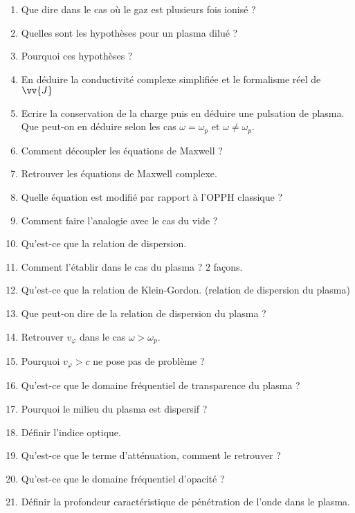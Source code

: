 \documentclass[a4paper, 11pt, hidelinks]{article}
\begin{document}
\begin{enumerate}
    \item Que dire dans le cas où le gaz est plusieurs fois ionisé ? \cite{Chapitre16}
    \item Quelles sont les hypothèses pour un plasma dilué ? \cite{Chapitre16}
    \item Pourquoi ces hypothèses ? \cite{Chapitre16}
    \item En déduire la conductivité complexe simplifiée et le formalisme réel de $\vv{J}$ \cite{Chapitre16}
    \item Ecrire la conservation de la charge puis en déduire une pulsation de plasma. Que peut-on en déduire selon les cas $\omega=\omega_p$ et $\omega\neq \omega_p$. \cite{Chapitre16}
    \item Comment découpler les équations de Maxwell ? \cite{Chapitre16}
    \item Retrouver les équations de Maxwell complexe. \cite{Chapitre16}
    \item Quelle équation est modifié par rapport à l'OPPH classique ? \cite{Chapitre16}
    \item Comment faire l'analogie avec le cas du vide ? \cite{Chapitre16}
    \item Qu'est-ce que la relation de dispersion. \cite{Chapitre16}
    \item Comment l'établir dans le cas du plasma ? $2$ façons. \cite{Chapitre16}
    \item Qu'est-ce que la relation de Klein-Gordon. (relation de dispersion du plasma) \cite{Chapitre16}
    \item Que peut-on dire de la relation de dispersion du plasma ? \cite{Chapitre16}
    \item Retrouver $v_{\varphi}$ dans le cas $\omega > \omega_p$. \cite{Chapitre16}
    \item Pourquoi $v_{\varphi}>c$ ne pose pas de problème ? \cite{Chapitre16}
    \item Qu'est-ce que le domaine fréquentiel de transparence du plasma ? \cite{Chapitre16}
    \item Pourquoi le milieu du plasma est dispersif ? \cite{Chapitre16}
    \item Définir l'indice optique. \cite{Chapitre16}
    \item Qu'est-ce que le terme d'atténuation, comment le retrouver ? \cite{Chapitre16}
    \item Qu'est-ce que le domaine fréquentiel d'opacité ? \cite{Chapitre16}
    \item Définir la profondeur caractéristique de pénétration de l'onde dans le plasma. \cite{Chapitre16}

\end{enumerate}
\end{document}
